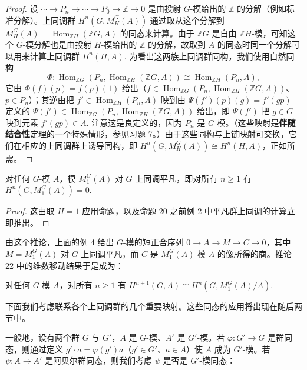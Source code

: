 \begin{proof}
设 \(\cdots \to P_n \to \cdots \to P_0 \to \mathbb{Z} \to 0\) 是由投射 \(G\)-模给出的 \(\mathbb{Z}\) 的分解（例如标准分解）。上同调群 \(H^n(G, M_H^G(A))\) 通过取从这个分解到 \(M_H^G(A) = \operatorname{Hom}_{\mathbb{Z}H}(\mathbb{Z}G, A)\) 的同态来计算。由于 \(\mathbb{Z}G\) 是自由 \(\mathbb{Z}H\)-模，可知这个 \(G\)-模分解也是由投射 \(H\)-模给出的 \(\mathbb{Z}\) 的分解，故取到 \(A\) 的同态时同一个分解可以用来计算上同调群 \(H^n(H, A)\). 为看出这两族上同调群同构，我们使用自然同构
\[
\Phi : \operatorname{Hom}_{\mathbb{Z}G}(P_n, \operatorname{Hom}_{\mathbb{Z}H}(\mathbb{Z}G, A)) \cong \operatorname{Hom}_{\mathbb{Z}H}(P_n, A),
\]
它由 \(\Phi(f)(p) = f(p)(1)\) 给出（\(f \in \operatorname{Hom}_{\mathbb{Z}G}(P_n, \operatorname{Hom}_{\mathbb{Z}H}(\mathbb{Z}G, A))\)、\(p \in P_n\)）；其逆由把 \(f' \in \operatorname{Hom}_{\mathbb{Z}H}(P_n, A)\) 映到由 \(\Psi(f')(p)(g) = f'(gp)\) 定义的 \(\Psi(f') \in \operatorname{Hom}_{\mathbb{Z}G}(P_n, \operatorname{Hom}_{\mathbb{Z}H}(\mathbb{Z}G, A))\) 给出，即 \(\Psi(f')\) 把 \(g \in G\) 映到元素 \(f'(gp) \in A\). 注意这是良定义的，因为 \(P_n\) 是 \(G\)-模。（这些映射是\textbf{伴随结合性}定理的一个特殊情形，参见习题 7。）由于这些同构与上链映射可交换，它们在相应的上同调群上诱导同构，即 \(H^n(G, M_H^G(A)) \cong H^n(H, A)\)，正如所需。
\end{proof}

\begin{corollary}\label{cor:17.24}
对任何 \(G\)-模 \(A\)，模 \(M_1^G(A)\) 对 \(G\) 上同调平凡，即对所有 \(n \geq 1\) 有 \(H^n(G, M_1^G(A)) = 0\).
\end{corollary}

\begin{proof}
这由取 \(H = 1\) 应用命题，以及命题 20 之前例 2 中平凡群上同调的计算立即推出。
\end{proof}

由这个推论，上面的例 4 给出 \(G\)-模的短正合序列 \(0 \to A \to M \to C \to 0\)，其中 \(M = M_1^G(A)\) 对 \(G\) 上同调平凡，而 \(C\) 是 \(M_1^G(A)\) 模 \(A\) 的像所得的商。推论 22 中的维数移动结果于是成为：

\begin{corollary}\label{cor:17.25}
对任何 \(G\)-模 \(A\)，对所有 \(n \geq 1\) 有 \(H^{n+1}(G, A) \cong H^n(G, M_1^G(A)/A)\).
\end{corollary}

下面我们考虑联系各个上同调群的几个重要映射。这些同态的应用将出现在随后两节中。

一般地，设有两个群 \(G\) 与 \(G'\)，\(A\) 是 \(G\)-模、\(A'\) 是 \(G'\)-模。若 \(\varphi : G' \to G\) 是群同态，则通过定义 \(g' \cdot a = \varphi(g')a\)（\(g' \in G'\)、\(a \in A\)）使 \(A\) 成为 \(G'\)-模。若 \(\psi : A \to A'\) 是阿贝尔群同态，则我们考虑 \(\psi\) 是否是 \(G'\)-模同态：

